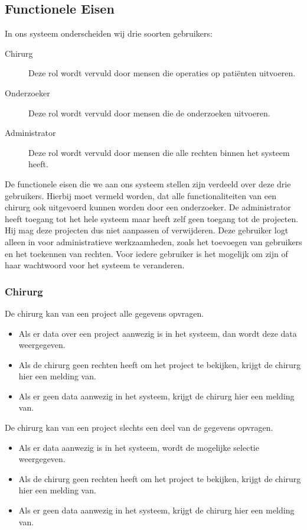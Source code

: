 \subsection{Functionele Eisen}
\label{functionele_eisen}
In ons systeem onderscheiden wij drie soorten gebruikers:
\begin{description}
	\item[Chirurg] Deze rol wordt vervuld door mensen die operaties op pati\"enten uitvoeren.
	\item[Onderzoeker] Deze rol wordt vervuld door mensen die de onderzoeken uitvoeren. 
	\item[Administrator] Deze rol wordt vervuld door mensen die alle rechten binnen het systeem heeft.
\end{description}
De functionele eisen die we aan ons systeem stellen zijn verdeeld over deze drie gebruikers. Hierbij moet vermeld worden, dat alle functionaliteiten van een chirurg ook uitgevoerd kunnen worden door een onderzoeker.
De administrator heeft toegang tot het hele systeem maar heeft zelf geen toegang tot de projecten. Hij mag deze projecten dus niet aanpassen of verwijderen. Deze gebruiker logt alleen in voor administratieve werkzaamheden, zoals het toevoegen van gebruikers en het toekennen van rechten.
Voor iedere gebruiker is het mogelijk om zijn of haar wachtwoord voor het systeem te veranderen.

\subsubsection{Chirurg}

De chirurg kan van een project alle gegevens opvragen.
\begin{itemize}
	\item Als er data over een project aanwezig is in het systeem, dan wordt deze data weergegeven.
	\item Als de chirurg geen rechten heeft om het project te bekijken, krijgt de chirurg hier een melding van.
	\item Als er geen data aanwezig in het systeem, krijgt de chirurg hier een melding van. 
\end{itemize}

De chirurg kan van een project slechts een deel van de gegevens opvragen.
\begin{itemize}
	\item Als er data aanwezig is in het systeem, wordt de mogelijke selectie weergegeven.
	\item Als de chirurg geen rechten heeft om het project te bekijken, krijgt de chirurg hier een melding van.
	\item Als er geen data aanwezig in het systeem, krijgt de chirurg hier een melding van.
\end{itemize}

